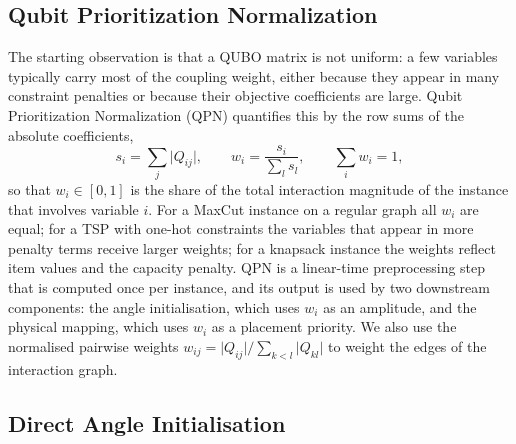 \subsection{Qubit Prioritization Normalization}\label{sec:nisq:qpn}

The starting observation is that a QUBO matrix is not uniform: a few variables typically carry most of the coupling weight, either because they appear in many constraint penalties or because their objective coefficients are large. Qubit Prioritization Normalization (QPN) quantifies this by the row sums of the absolute coefficients,
\begin{equation}\label{eq:nisq:qpn}
  s_{i} = \sum_{j} \lvert Q_{ij}\rvert, \qquad w_{i} = \frac{s_{i}}{\sum_{l} s_{l}}, \qquad \sum_{i} w_{i} = 1,
\end{equation}
so that $w_{i}\in[0,1]$ is the share of the total interaction magnitude of the instance that involves variable $i$. For a MaxCut instance on a regular graph all $w_{i}$ are equal; for a TSP with one-hot constraints the variables that appear in more penalty terms receive larger weights; for a knapsack instance the weights reflect item values and the capacity penalty. QPN is a linear-time preprocessing step that is computed once per instance, and its output is used by two downstream components: the angle initialisation, which uses $w_{i}$ as an amplitude, and the physical mapping, which uses $w_{i}$ as a placement priority. We also use the normalised pairwise weights $w_{ij}=\lvert Q_{ij}\rvert/\sum_{k<l}\lvert Q_{kl}\rvert$ to weight the edges of the interaction graph.

\subsection{Direct Angle Initialisation}\label{sec:nisq:init}

